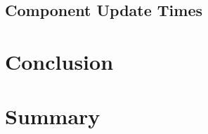 \documentclass[a4paper, fontsize=11pt]{article}
\begin{document}
\subsection{Component Update Times}\label{subsec:componentupdatetimes}

\section{Conclusion}\label{sec:conclusion}

\section{Summary}\label{sec:summary}

\pagebreak

\appendix
\glsaddall
\printnoidxglossary[type=\acronymtype,nonumberlist,style=long]


\nocite{*}
{}
\end{document}
